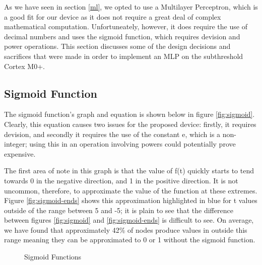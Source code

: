 
As we have seen in section \ref{ml}, we opted to use a Multilayer Perceptron, which is a good fit for our device as it does not require a great deal of complex mathematical computation. Unfortuneately, however, it does require the use of decimal numbers and uses the sigmoid function, which requires devision and power operations. This section discusses some of the design decisions and sacrifices that were made in order to implement an MLP on the subthreshold Cortex M0+.

\subsection{Sigmoid Function}
The sigmoid function's graph and equation is shown below in figure \ref{fig:sigmoid}. Clearly, this equation causes two issues for the proposed device: firstly, it requires devision, and secondly it requires the use of the constant e, which is a non-integer; using this in an operation involving powers could potentially prove expensive.

The first area of note in this graph is that the value of f(t) quickly starts to tend towards 0 in the negative direction, and 1 in the positive direction. It is not uncommon, therefore, to approximate the value of the function at these extremes. Figure \ref{fig:sigmoid-ends} shows this approximation highlighted in blue for t values outside of the range between 5 and -5; it is plain to see that the difference between figures \ref{fig:sigmoid} and \ref{fig:sigmoid-ends} is difficult to see. On average, we have found that approximately 42\%  of nodes produce values in outside this range meaning they can be approximated to 0 or 1 without the sigmoid function.

\begin{figure}[!htbp]
    \centering
    \caption{Sigmoid Functions \label{fig:sigmoid-options}}
\end{figure}

